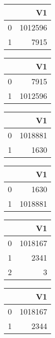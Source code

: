 \bigskip\bigskip
\centering
\begin{tabular}{rr}
  \hline
 & V1 \\ 
  \hline
0 & 1012596 \\ 
  1 & 7915 \\ 
   \hline
\end{tabular}

\bigskip\bigskip
\centering
\begin{tabular}{rr}
  \hline
 & V1 \\ 
  \hline
0 & 7915 \\ 
  1 & 1012596 \\ 
   \hline
\end{tabular}

\bigskip\bigskip
\centering
\begin{tabular}{rr}
  \hline
 & V1 \\ 
  \hline
0 & 1018881 \\ 
  1 & 1630 \\ 
   \hline
\end{tabular}

\bigskip\bigskip
\centering
\begin{tabular}{rr}
  \hline
 & V1 \\ 
  \hline
0 & 1630 \\ 
  1 & 1018881 \\ 
   \hline
\end{tabular}

\bigskip\bigskip
\centering
\begin{tabular}{rr}
  \hline
 & V1 \\ 
  \hline
0 & 1018167 \\ 
  1 & 2341 \\ 
  2 &   3 \\ 
   \hline
\end{tabular}

\bigskip\bigskip
\centering
\begin{tabular}{rr}
  \hline
 & V1 \\ 
  \hline
0 & 1018167 \\ 
  1 & 2344 \\ 
   \hline
\end{tabular}


